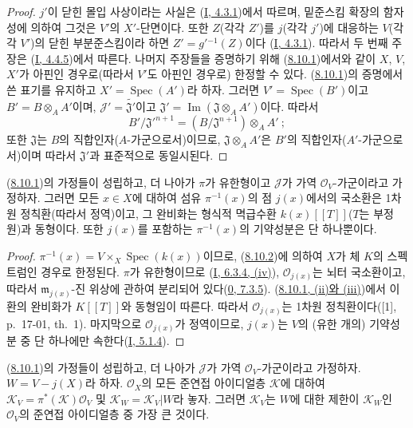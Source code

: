\begin{proof}
$j'$이 닫힌 몰입 사상이라는 사실은
(\hyperref[I.4.3.1-ko]{I, 4.3.1})에서 따르며, 밑준스킴 확장의
함자성에 의하여 그것은 $V'$의 $X'$-단면이다. 또한 $Z$(각각 $Z'$)를
$j$(각각 $j'$)에 대응하는 $V$(각각 $V'$)의 닫힌 부분준스킴이라 하면
$Z'=g'{}^{-1}(Z)$이다
(\hyperref[I.4.3.1-ko]{I, 4.3.1}). 따라서 두 번째 주장은
(\hyperref[I.4.4.5-ko]{I, 4.4.5})에서 따른다. 나머지 주장들을
증명하기 위해 (\hyperref[II.8.10.1-ko]{8.10.1})에서와 같이 $X$, $V$,
$X'$가 아핀인 경우로(따라서 $V'$도 아핀인 경우로) 한정할 수 있다.
(\hyperref[II.8.10.1-ko]{8.10.1})의 증명에서 쓴 표기를 유지하고
$X'=\operatorname{Spec}(A')$라 하자. 그러면
$V'=\operatorname{Spec}(B')$이고 $B'=B\otimes_A A'$이며,
$\mathcal{J}'=\widetilde{\mathfrak{J}'}$이고
$\mathfrak{J}'=\operatorname{Im}(\mathfrak{J}\otimes_A A')$이다. 따라서
\[
  B'/\mathfrak{J}'^{n+1}=(B/\mathfrak{J}^{n+1})\otimes_A A'~;
\]
또한 $\mathfrak{J}$는 $B$의 직합인자($A$-가군으로서)이므로,
$\mathfrak{J}\otimes_A A'$은 $B'$의 직합인자($A'$-가군으로서)이며
따라서 $\mathfrak{J}'$과 표준적으로 동일시된다.
\end{proof}

\begin{corollary}[8.10.3]
\label{II.8.10.3-ko}
(\hyperref[II.8.10.1-ko]{8.10.1})의 가정들이 성립하고, 더 나아가
$\pi$가 유한형이고 $\mathcal{J}$가 가역 $\mathcal{O}_V$-가군이라고
가정하자. 그러면 모든 $x\in X$에 대하여 섬유 $\pi^{-1}(x)$의 점
$j(x)$에서의 국소환은 1차원 정칙환(따라서 정역)이고, 그 완비화는
형식적 멱급수환 $k(x)[[T]]$($T$는 부정원)과 동형이다. 또한
$j(x)$를 포함하는 $\pi^{-1}(x)$의 기약성분은 단 하나뿐이다.
\end{corollary}

\begin{proof}
$\pi^{-1}(x)=V\times_X\operatorname{Spec}(k(x))$이므로,
(\hyperref[II.8.10.2-ko]{8.10.2})에 의하여 $X$가 체 $K$의 스펙트럼인
경우로 한정된다. $\pi$가 유한형이므로
(\hyperref[I.6.3.4-ko]{I, 6.3.4, (iv)}), $\mathcal{O}_{j(x)}$는 뇌터
국소환이고, 따라서 $\mathfrak{m}_{j(x)}$-진 위상에 관하여 분리되어
있다(\hyperref[0.7.3.5-ko]{0, 7.3.5}).
(\hyperref[II.8.10.1-ko]{8.10.1, (ii)와 (iii)})에서 이 환의 완비화가
$K[[T]]$와 동형임이 따른다. 따라서 $\mathcal{O}_{j(x)}$는 1차원
정칙환이다([1], p.~17-01, th.~1). 마지막으로 $\mathcal{O}_{j(x)}$가
정역이므로, $j(x)$는 $V$의 (유한 개의) 기약성분 중 단 하나에만
속한다(\hyperref[I.5.1.4-ko]{I, 5.1.4}).
\end{proof}

\begin{corollary}[8.10.4]
\label{II.8.10.4-ko}
(\hyperref[II.8.10.1-ko]{8.10.1})의 가정들이 성립하고, 더 나아가
$\mathcal{J}$가 가역 $\mathcal{O}_V$-가군이라고 가정하자.
$W=V-j(X)$라 하자. $\mathcal{O}_X$의 모든 준연접 아이디얼층
$\mathcal{K}$에 대하여
$\mathcal{K}_V=\pi^*(\mathcal{K})\mathcal{O}_V$ 및
$\mathcal{K}_W=\mathcal{K}_V|W$라 놓자. 그러면 $\mathcal{K}_V$는
$W$에 대한 제한이 $\mathcal{K}_W$인 $\mathcal{O}_V$의 준연접
아이디얼층 중 가장 큰 것이다.
\end{corollary}

